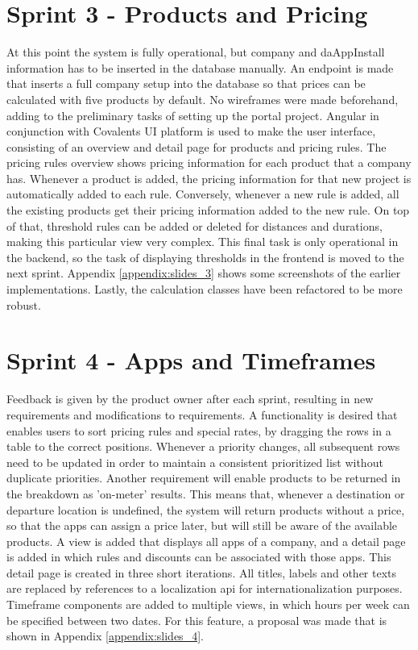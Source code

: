 \section{Sprint 3 - Products and Pricing}
At this point the system is fully operational, but company and daAppInstall information has to be inserted in the database manually. An endpoint is made that inserts a full company setup into the database so that prices can be calculated with five products by default. No wireframes were made beforehand, adding to the preliminary tasks of setting up the portal project. Angular in conjunction with Covalents UI platform is used to make the user interface, consisting of an overview and detail page for products and pricing rules. The pricing rules overview shows pricing information for each product that a company has. Whenever a product is added, the pricing information for that new project is automatically added to each rule. Conversely, whenever a new rule is added, all the existing products get their pricing information added to the new rule. On top of that, threshold rules can be added or deleted for distances and durations, making this particular view very complex. This final task is only operational in the backend, so the task of displaying thresholds in the frontend is moved to the next sprint. Appendix \ref{appendix:slides_3} shows some screenshots of the earlier implementations. Lastly, the calculation classes have been refactored to be more robust.

%
\section{Sprint 4 - Apps and Timeframes}
Feedback is given by the product owner after each sprint, resulting in new requirements and modifications to requirements. A functionality is desired that enables users to sort pricing rules and special rates, by dragging the rows in a table to the correct positions. Whenever a priority changes, all subsequent rows need to be updated in order to maintain a consistent prioritized list without duplicate priorities. Another requirement will enable products to be returned in the breakdown as 'on-meter' results. This means that, whenever a destination or departure location is undefined, the system will return products without a price, so that the apps can assign a price later, but will still be aware of the available products. A view is added that displays all apps of a company, and a detail page is added in which rules and discounts can be associated with those apps. This detail page is created in three short iterations. All titles, labels and other texts are replaced by references to a localization api for internationalization purposes. Timeframe components are added to multiple views, in which hours per week can be specified between two dates. For this feature, a proposal was made that is shown in Appendix \ref{appendix:slides_4}.

